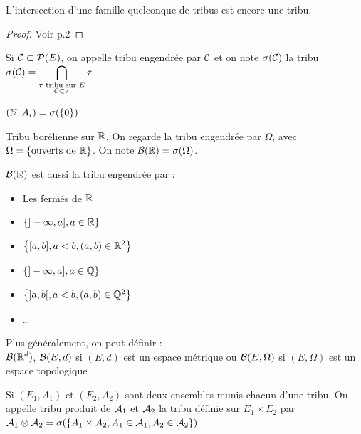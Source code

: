 \documentclass[]{report}
\begin{document}
\begin{prop}
    L'intersection d'une famille quelconque de tribus est encore une tribu.
\end{prop}

\begin{proof}
    Voir p.2
\end{proof}

\begin{df}
Si $\mathcal{C}\subset\mathcal{P}(E)$, on appelle tribu engendrée par $\mathcal{C}$ et on note $\sigma(\mathcal{C})$ la tribu $\displaystyle{\sigma(\mathcal{C})=\bigcap_{\substack{\tau\text{ tribu sur }E\\\mathcal{C}\subset\tau}}\tau}$
\end{df}

\begin{ex}
    $(\mathbb{N},A_i)=\sigma(\{0\})$
\end{ex}

\begin{df}
    Tribu borélienne sur $\mathbb{R}$. On regarde la tribu engendrée par $\Omega$, avec $\Omega=\left\{ \text{ouverts de }\mathbb{R}\right\}$. On note $\mathcal{B}(\mathbb{R})=\sigma(\Omega)$. 
\end{df}

\begin{prop}
    $\mathcal{B}(\mathbb{R})$ est aussi la tribu engendrée par : \begin{itemize}
        \item Les fermés de $\mathbb{R}$
        \item $\left\{  ]-\infty,a],a\in\mathbb{R}  \right\}$
        \item $\left\{  [a,b],a<b,(a,b)\in\mathbb{R}^2  \right\}$
        \item $\left\{  ]-\infty,a],a\in\mathbb{Q}  \right\}$
        \item $\left\{  ]a,b[,a<b,(a,b)\in\mathbb{Q}^2  \right\}$
        \item \dots
    \end{itemize}
    Plus généralement, on peut définir :\\
    $\mathcal{B}(\mathbb{R}^d)$, $\mathcal{B}(E,d)$ si $(E,d)$ est un espace métrique ou $\mathcal{B}(E,\Omega)$ si $(E,\Omega)$ est un espace topologique
\end{prop}

\begin{df}
    Si $(E_1,A_1)$ et $(E_2,A_2)$ sont deux ensembles munis chacun d'une tribu. On appelle tribu produit de $\mathcal{A}_1$ et $\mathcal{A}_2$ la tribu définie sur $E_1\times E_2$ par $\mathcal{A}_1\otimes\mathcal{A}_2=\sigma(\left\{ A_1\times A_2,A_1\in\mathcal{A}_1,A_2\in\mathcal{A}_2 \right\})$
\end{df}
\end{document}
